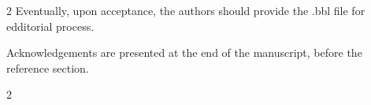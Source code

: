 \documentclass{rmf-d}
\begin{document}
\begin{multicols}{2}
\noindent
Eventually, upon acceptance, the authors should provide the .bbl file for edditorial process.

Acknowledgements are presented at the end of the manuscript, before the reference section. 

\end{multicols}

\medline
\begin{multicols}{2}
%
\nocite{*}


%
%
%

%
%
\end{multicols}
\end{document}
